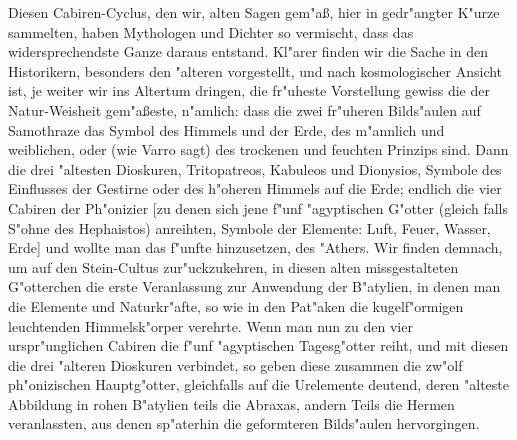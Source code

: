 \documentclass[a4paper, 11pt, oneside, polutonikogreek, german]{article}
\begin{document}
Diesen Cabiren-Cyclus, den wir, alten Sagen gem"aß, hier in gedr"angter K"urze sammelten, haben Mythologen und Dichter so vermischt, dass das widersprechendste Ganze daraus entstand. Kl"arer finden wir die Sache in den Historikern, besonders den "alteren vorgestellt, und nach kosmologischer Ansicht ist, je weiter wir ins Altertum dringen, die fr"uheste Vorstellung gewiss die der Natur-Weisheit gem"aßeste, n"amlich: dass die zwei fr"uheren Bilds"aulen auf Samothraze das Symbol des Himmels und der Erde, des m"annlich und weiblichen, oder (wie Varro sagt) des trockenen und feuchten Prinzips sind. Dann die drei "altesten Dioskuren, Tritopatreos, Kabuleos und Dionysios, Symbole des Einflusses der Gestirne oder des h"oheren Himmels auf die Erde; endlich die vier Cabiren der Ph"onizier [zu denen sich jene f"unf "agyptischen G"otter (gleich falls S"ohne des Hephaistos) anreihten, Symbole der Elemente: Luft, Feuer, Wasser, Erde] und wollte man das f"unfte hinzusetzen, des "Athers. Wir finden demnach, um auf den Stein-Cultus zur"uckzukehren, in diesen alten missgestalteten G"otterchen die erste Veranlassung zur Anwendung der B"atylien, in denen man die Elemente und Naturkr"afte, so wie in den Pat"aken die kugelf"ormigen leuchtenden Himmelsk"orper verehrte. Wenn man nun zu den vier urspr"unglichen Cabiren die f"unf "agyptischen Tagesg"otter reiht, und mit diesen die drei "alteren Dioskuren verbindet, so geben diese zusammen die zw"olf ph"onizischen Hauptg"otter, gleichfalls auf die Urelemente deutend, deren "alteste Abbildung in rohen B"atylien teils die Abraxas, andern Teils die Hermen veranlassten, aus denen sp"aterhin die geformteren Bilds"aulen hervorgingen.
\end{document}

